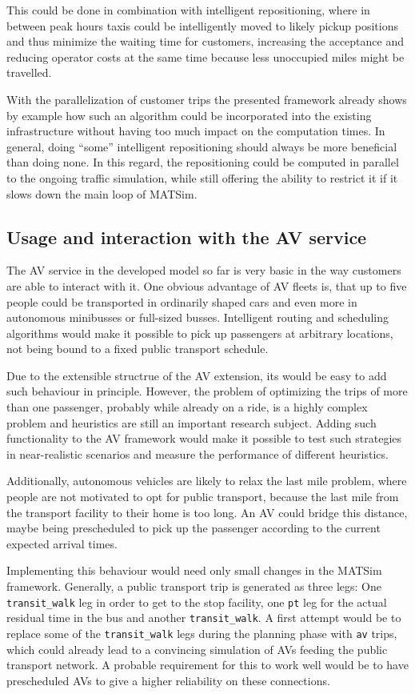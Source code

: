 This could be done in combination with intelligent repositioning, where in between peak
hours taxis could be intelligently moved to likely pickup positions and thus minimize the waiting
time for customers, increasing the acceptance and reducing
operator costs at the same time because less unoccupied miles might be travelled.

With the parallelization of customer trips the presented framework already shows
by example how such an algorithm could be incorporated into the existing infrastructure
without having too much impact on the computation times. In general, doing ``some''
intelligent repositioning should always be more beneficial than doing none. In
this regard, the repositioning could be computed in parallel to the ongoing
traffic simulation, while still offering the ability to restrict it if it slows
down the main loop of MATSim.

\subsection{Usage and interaction with the AV service}

The AV service in the developed model so far is very basic in the way customers
are able to interact with it. One obvious advantage of AV fleets is, that up to five people could be transported
in ordinarily shaped cars and even more in autonomous minibusses or full-sized busses.
Intelligent routing and scheduling algorithms would make it possible to pick up passengers
at arbitrary locations, not being bound to a fixed public transport schedule.

Due to the extensible structrue of the AV extension, its would be easy to
add such behaviour in principle. However, the problem of optimizing the trips of
more than one passenger, probably while already on a ride, is a highly complex
problem and heuristics are still an important research subject.
Adding such functionality to the AV framework would make it possible to test such
strategies in near-realistic scenarios and measure the performance of different
heuristics.

Additionally, autonomous vehicles are likely to relax the last mile problem, where people are not
motivated to opt for public transport, because the last mile from the transport
facility to their home is too long. An AV could bridge this distance, maybe being
prescheduled to pick up the passenger according to the current expected arrival
times.

Implementing this behaviour would need only small changes in the MATSim framework.
Generally, a public transport trip is generated as three legs: One \texttt{transit\_walk}
leg in order to get to the stop facility, one \texttt{pt} leg for the actual residual
time in the bus  and another \texttt{transit\_walk}. A first attempt
would be to replace some of the \texttt{transit\_walk} legs during the planning
phase with \texttt{av} trips, which could already lead to a convincing simulation
of AVs feeding the public transport network.
A probable requirement for this to work well would be to have prescheduled AVs
to give a higher reliability on these connections.


